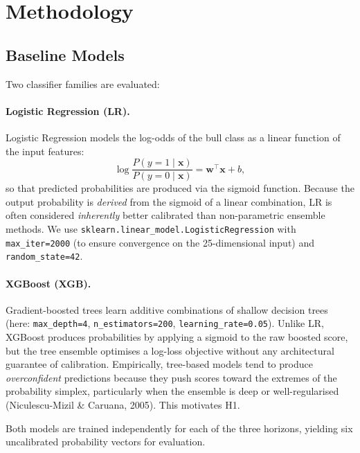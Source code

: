 \documentclass[12pt]{article}
\begin{document}
\section{Methodology}

\subsection{Baseline Models}

Two classifier families are evaluated:

\paragraph{Logistic Regression (LR).}
Logistic Regression models the log-odds of the bull class as a linear function
of the input features:
\begin{equation}
  \log \frac{P(y=1 \mid \mathbf{x})}{P(y=0 \mid \mathbf{x})} = \mathbf{w}^\top \mathbf{x} + b,
\end{equation}
so that predicted probabilities are produced via the sigmoid function.
Because the output probability is \emph{derived} from the sigmoid of a linear
combination, LR is often considered \textit{inherently} better calibrated than
non-parametric ensemble methods.
We use \texttt{sklearn.linear\_model.LogisticRegression} with \texttt{max\_iter=2000}
(to ensure convergence on the 25-dimensional input) and \texttt{random\_state=42}.

\paragraph{XGBoost (XGB).}
Gradient-boosted trees learn additive combinations of shallow decision trees
(here: \texttt{max\_depth=4}, \texttt{n\_estimators=200},
\texttt{learning\_rate=0.05}).
Unlike LR, XGBoost produces probabilities by applying a sigmoid to the raw
boosted score, but the tree ensemble optimises a log-loss objective without
any architectural guarantee of calibration.
Empirically, tree-based models tend to produce \emph{overconfident} predictions
because they push scores toward the extremes of the probability simplex,
particularly when the ensemble is deep or well-regularised
(Niculescu-Mizil \& Caruana, 2005).
This motivates H1.

Both models are trained independently for each of the three horizons, yielding
six uncalibrated probability vectors for evaluation.
\end{document}
